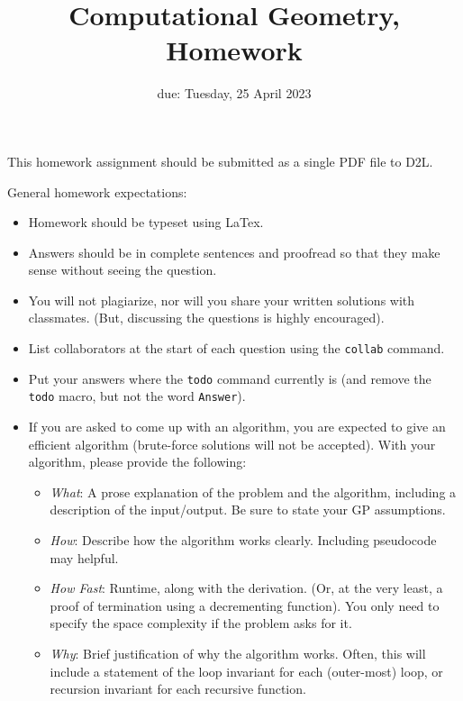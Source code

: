 \documentclass{article}
\title{Computational Geometry, Homework \hwnum}
\date{due: Tuesday, 25 April 2023}
\author{\todo{Your Name Here}}
\begin{document}
\maketitle

This homework assignment should be
submitted as a single PDF file to D2L.

General homework expectations:
\begin{itemize}
    \item Homework should be typeset using LaTex.
    \item Answers should be in complete sentences and proofread so that they
        make sense without seeing the question.
    \item You will not plagiarize, nor will you share your written solutions
        with classmates. (But, discussing the questions is highly encouraged).
    \item List collaborators at the start of each question using the
        \texttt{collab} command.
    \item Put your answers where the \texttt{todo} command currently is (and
        remove the \texttt{todo} macro, but not the word \texttt{Answer}).
    \item If you are asked to come up with an algorithm, you are
        expected to give an efficient algorithm (brute-force solutions will not
        be accepted). With your algorithm, please provide the following:
        \begin{itemize}
            \item \emph{What}: A prose explanation of the problem and the algorithm,
                including a description of the input/output.  Be sure to state
                your GP assumptions.
            \item \emph{How}: Describe how the algorithm works clearly.
                Including pseudocode may helpful.
            \item \emph{How Fast}: Runtime, along with the derivation.  (Or, at
                the very least, a proof of termination using a decrementing
                function).  You only need to specify the space complexity if the
                problem asks for it.
           \item \emph{Why}: Brief justification of why the algorithm works.
               Often, this will include a statement of the loop invariant for each
               (outer-most) loop, or recursion invariant for each recursive function.
        \end{itemize}
\end{itemize}
\end{document}
